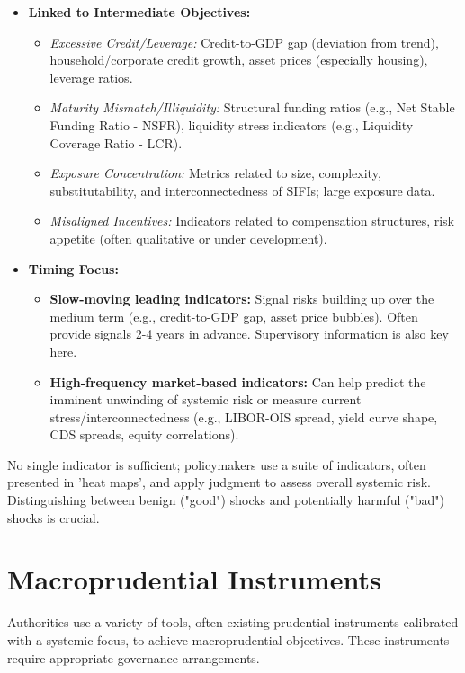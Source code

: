 \begin{itemize}
    \item \textbf{Linked to Intermediate Objectives:}
        \begin{itemize}
            \item \textit{Excessive Credit/Leverage:} Credit-to-GDP gap (deviation from trend), household/corporate credit growth, asset prices (especially housing), leverage ratios.
            \item \textit{Maturity Mismatch/Illiquidity:} Structural funding ratios (e.g., Net Stable Funding Ratio - NSFR), liquidity stress indicators (e.g., Liquidity Coverage Ratio - LCR).
            \item \textit{Exposure Concentration:} Metrics related to size, complexity, substitutability, and interconnectedness of SIFIs; large exposure data.
            \item \textit{Misaligned Incentives:} Indicators related to compensation structures, risk appetite (often qualitative or under development).
        \end{itemize}
    \item \textbf{Timing Focus:}
        \begin{itemize}
            \item \textbf{Slow-moving leading indicators:} Signal risks building up over the medium term (e.g., credit-to-GDP gap, asset price bubbles). Often provide signals 2-4 years in advance. Supervisory information is also key here.
            \item \textbf{High-frequency market-based indicators:} Can help predict the imminent unwinding of systemic risk or measure current stress/interconnectedness (e.g., LIBOR-OIS spread, yield curve shape, CDS spreads, equity correlations).
        \end{itemize}
\end{itemize}
No single indicator is sufficient; policymakers use a suite of indicators, often presented in 'heat maps', and apply judgment to assess overall systemic risk. Distinguishing between benign ("good") shocks and potentially harmful ("bad") shocks is crucial.

\section{Macroprudential Instruments}

Authorities use a variety of tools, often existing prudential instruments calibrated with a systemic focus, to achieve macroprudential objectives. These instruments require appropriate governance arrangements.

